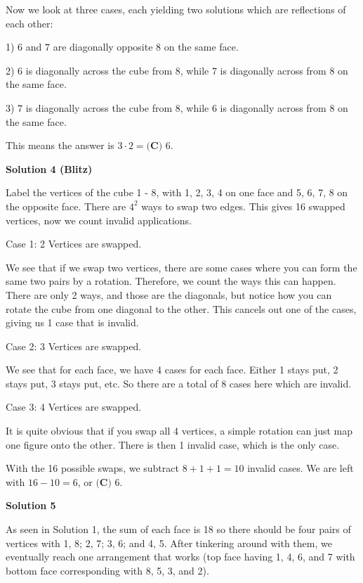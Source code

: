 \begin{enumerate}
 Now we look at three cases, each yielding two solutions which are reflections of each other:

 1) $6$ and $7$ are diagonally opposite $8$ on the same face.

 2) $6$ is diagonally across the cube from $8$, while $7$ is diagonally across from $8$ on the same face.

 3) $7$ is diagonally across the cube from $8$, while $6$ is diagonally across from $8$ on the same face.

 This means the answer is $3\cdot 2=\boxed{\textbf{(C) }6.}$




\textbf{Solution 4 (Blitz)}

Label the vertices of the cube 1 - 8, with 1, 2, 3, 4 on one face and 5, 6, 7, 8 on the opposite face. There are \( 4^2 \) ways to swap two edges. This gives 16 swapped vertices, now we count invalid applications.

 Case 1: 2 Vertices are swapped.

 We see that if we swap two vertices, there are some cases where you can form the same two pairs by a rotation. Therefore, we count the ways this can happen. There are only 2 ways, and those are the diagonals, but notice how you can rotate the cube from one diagonal to the other. This cancels out one of the cases, giving us 1 case that is invalid.

 Case 2: 3 Vertices are swapped.

 We see that for each face, we have 4 cases for each face. Either 1 stays put, 2 stays put, 3 stays put, etc. So there are a total of 8 cases here which are invalid.

 Case 3: 4 Vertices are swapped.

 It is quite obvious that if you swap all 4 vertices, a simple rotation can just map one figure onto the other. There is then 1 invalid case, which is the only case.

 With the 16 possible swaps, we subtract \( 8 + 1 + 1 = 10 \) invalid cases. We are left with \( 16-10=6 \), or $\boxed{\textbf{(C) }6.}$




\textbf{Solution 5}

As seen in Solution 1, the sum of each face is 18 so there should be four pairs of vertices with 1, 8; 2, 7; 3, 6; and 4, 5. After tinkering around with them, we eventually reach one arrangement that works (top face having 1, 4, 6, and 7 with bottom face corresponding with 8, 5, 3, and 2).


\end{enumerate}
